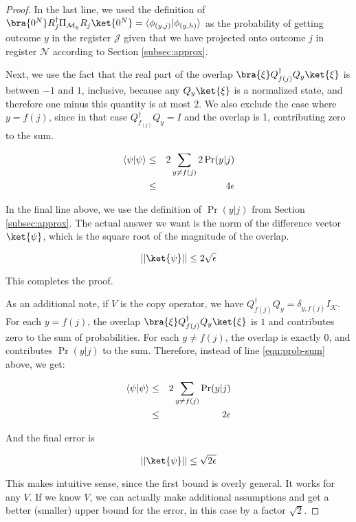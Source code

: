 \begin{proof}
In the last line, we used the definition of
$\bra{0^N}R_j^{\dagger}\Pi_{\mathcal{M}_y}R_j\ket{0^N} = \braket{\phi_{(y,j)}}{\phi_{(y,h)}}$
as the probability of getting outcome $y$ in the register
$\mathcal{J}$ given that we have projected onto outcome $j$ in register
$\mathcal{N}$ according to Section \ref{subsec:approx}.

Next, we use the fact that the real part of the overlap
$\bra{\xi}Q_{f(j)}^{\dagger}Q_y \ket{\xi}$ is between $-1$ and $1$, inclusive,
because any $Q_y\ket{\xi}$ is a normalized state, and therefore one minus
this quantity is at most $2$. We also exclude the case where
$y = f(j)$, since in that case $Q_{f_(j)}^{\dagger}Q_y = I$ and the overlap
is 1, contributing zero to the sum.

\begin{eqnarray}
\langle \psi|\psi \rangle & \le & 2 \sum_{y \ne f(j)} 2\Pr(y|j) \label{eqn:prob-sum}\\
                    & \le & 4\epsilon
\end{eqnarray}

In the final line above, we use the definition of $\Pr(y|j)$ from
Section \ref{subsec:approx}. The actual answer we want is the norm
of the difference vector $\ket{\psi}$, which is the square root of the
magnitude of the overlap.

\begin{equation}
\lvert\lvert \ket{\psi} \rvert\rvert \le 2\sqrt{\epsilon}
\end{equation}

This completes the proof.

As an additional note, if $V$ is the copy operator, we have
$Q_{f(j)}^{\dagger}Q_y = \delta_{y,f(j)}I_{\mathcal{K}}$.
For each $y = f(j)$, the overlap $\bra{\xi}Q_{f(j)}^{\dagger}Q_y \ket{\xi}$
is $1$ and contributes zero to the sum of probabilities.
For each $y \ne f(j)$, the overlap is exactly $0$, and contributes
$\Pr(y|j)$ to the sum.
Therefore, instead of line \ref{eqn:prob-sum} above, we get:

\begin{eqnarray}
\langle \psi|\psi \rangle & \le & 2\sum_{y \ne f(j)} \Pr(y|j)\\
                    & \le & 2\epsilon
\end{eqnarray}

And the final error is

\begin{equation}
\lvert\lvert \ket{\psi} \rvert\rvert \le \sqrt{2\epsilon}
\end{equation}

This makes intuitive sense, since the first bound is overly general.
It works for any $V$. If we know $V$, we can actually make additional
assumptions and get a better (smaller) upper bound for the error, in this
case by a factor $\sqrt{2}$.
\end{proof}

